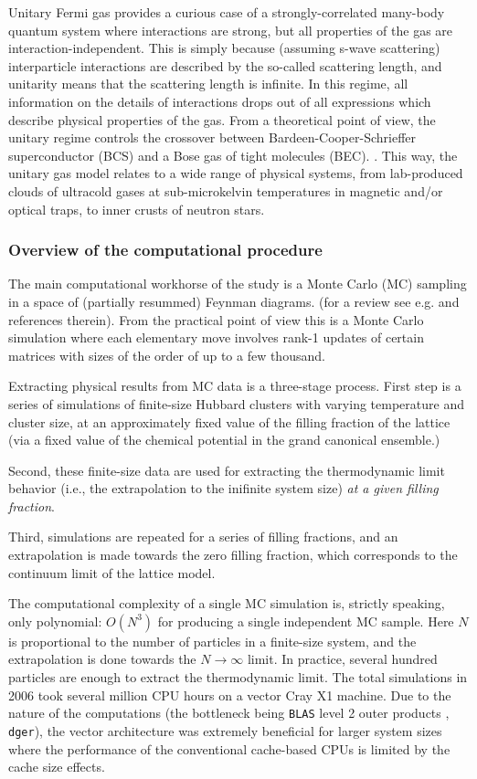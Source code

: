 
Unitary Fermi gas provides a curious case of a strongly-correlated many-body
quantum system where interactions are strong, but all properties of the gas are
interaction-independent. This is simply because (assuming s-wave scattering)
interparticle interactions are described by the so-called scattering length, 
and unitarity means that the scattering length is infinite. In this regime, all
information on the details of interactions drops out of all expressions which 
describe physical properties of the gas. From a theoretical point of view, the unitary regime controls
the crossover between Bardeen-Cooper-Schrieffer superconductor (BCS) and a Bose
gas of tight molecules (BEC). \cite{Eagles:1969, Legett:1980}. 
This way, the unitary gas model relates
to a wide range of physical systems, from lab-produced clouds of ultracold gases at
sub-microkelvin temperatures in magnetic and/or optical traps, to inner crusts of
neutron stars.

\subsubsection{Overview of the computational procedure}

The main computational workhorse of the study \cite{PRL:2006, NJP:2006} is a
Monte Carlo (MC) sampling in a space of (partially resummed) Feynman diagrams. 
(for a review see e.g. \cite{Gull:2011} and references therein). From the
practical point of view this is a Monte Carlo simulation where each elementary
move involves rank-1 updates of certain matrices with sizes of the order of up to
 a few thousand.

Extracting physical results from MC data is a three-stage process. First step is
a series of simulations of finite-size Hubbard clusters with varying temperature
and cluster size, at an approximately fixed value of the filling fraction of the lattice 
(via a fixed value of the chemical potential in the grand canonical ensemble.)

Second, these finite-size data are used for extracting the thermodynamic limit behavior
(i.e., the extrapolation to the inifinite system size) \emph{at a given filling fraction}.

Third, simulations are repeated for a series of filling fractions, and an
extrapolation is made towards the zero filling fraction, which corresponds to 
the continuum limit of the lattice model.

The computational complexity of a single MC simulation is, strictly speaking,
only polynomial: $O(N^3)$ for producing a single independent MC sample. Here $N$ is
proportional to the number of particles in a finite-size system, and the extrapolation
is done towards the $N\to\infty$ limit. In practice, several hundred particles are
enough to extract the thermodynamic limit.
The total simulations in 2006 took several million CPU hours on a vector Cray X1 machine.
Due to the nature of the computations (the bottleneck being
\texttt{BLAS} level 2  outer products , \texttt{dger}), the vector architecture was
extremely beneficial for larger system sizes where the performance of the 
conventional cache-based CPUs is limited by the cache size effects.

